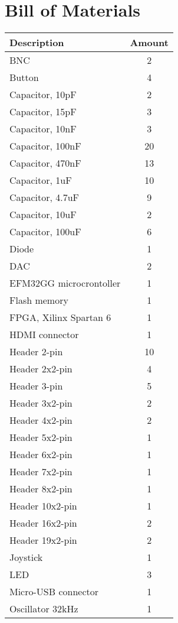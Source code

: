\chapter{Bill of Materials}
\label{app:bom}
\begin{longtable}{|l|c|}
	\hline
	\textbf{Description} & \textbf{Amount} \\ [0.5ex]
	\hline
	BNC & 2 \\ \hline
	Button & 4 \\ \hline
	Capacitor, 10pF & 2 \\ \hline
	Capacitor, 15pF & 3 \\ \hline
	Capacitor, 10nF & 3 \\ \hline
	Capacitor, 100nF & 20 \\ \hline
	Capacitor, 470nF & 13 \\ \hline
	Capacitor, 1uF & 10 \\ \hline
	Capacitor, 4.7uF & 9 \\ \hline
	Capacitor, 10uF & 2 \\ \hline
	Capacitor, 100uF & 6 \\ \hline
	Diode & 1 \\ \hline
	DAC & 2 \\ \hline
	EFM32GG microcrontoller & 1 \\ \hline
	Flash memory & 1 \\ \hline
	FPGA, Xilinx Spartan 6 & 1 \\ \hline
	HDMI connector & 1 \\ \hline
	Header 2-pin & 10 \\ \hline
	Header 2x2-pin & 4 \\ \hline
	Header 3-pin & 5 \\ \hline
	Header 3x2-pin & 2 \\ \hline
	Header 4x2-pin & 2 \\ \hline
	Header 5x2-pin & 1 \\ \hline
	Header 6x2-pin & 1 \\ \hline
	Header 7x2-pin & 1 \\ \hline
	Header 8x2-pin & 1 \\ \hline
	Header 10x2-pin & 1 \\ \hline
	Header 16x2-pin & 2 \\ \hline
	Header 19x2-pin & 2 \\ \hline
	Joystick & 1 \\ \hline
	LED & 3 \\ \hline
	Micro-USB connector & 1 \\ \hline
	Oscillator 32kHz & 1 \\ \hline

\end{longtable}
